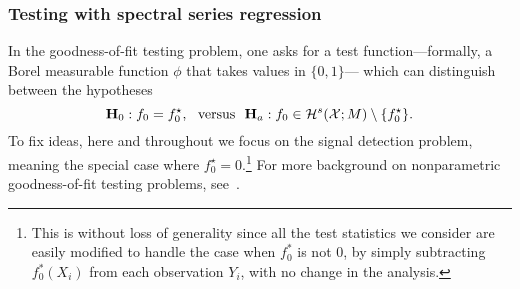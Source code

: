 \subsubsection{Testing with spectral series regression}
In the goodness-of-fit testing problem, one asks for a test function---formally, a Borel measurable function $\phi$ that takes values in $\{0,1\}$--- which can distinguish between the hypotheses
\begin{equation}
\mathbf{H}_0: f_0 = f_0^{\star}, ~~\textrm{versus}~~ \mathbf{H}_a: f_0 \in \mathcal{H}^{s}(\mathcal{X};M) \setminus \{f_0^{\star}\}.
\end{equation} 
To fix ideas, here and throughout we focus on the signal detection problem, meaning the special case where $f_0^{\star} = 0$.\footnote{This is without loss of generality since all the test statistics we consider are easily modified to handle the case when $f_0^{\ast}$ is not $0$, by simply subtracting $f_0^{\ast}(X_i)$ from each observation $Y_i$, with no change in the analysis.} For more background on nonparametric goodness-of-fit testing problems, see~\cite{ingster2012}.

